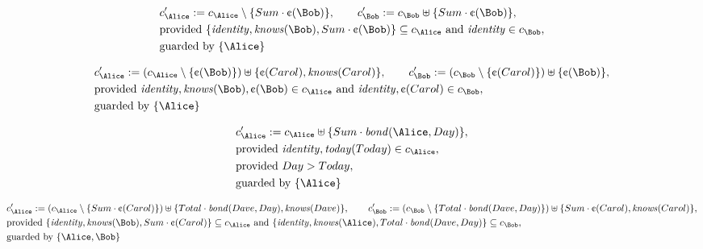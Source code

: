 \begin{align*}
&
c'_
{
\Alice
}
 := 
c_
{
\Alice
}
 \setminus 
\{
Sum
\cdot
\text{\textcent}
(
\Bob
)
\}
, \qquad 
c'_
{
\Bob
}
 := 
c_
{
\Bob
}
 \uplus 
\{
Sum
\cdot
\text{\textcent}
(
\Bob
)
\}
,\\
&
\text{provided } 
\{
\mathit{
identity
}
,
\mathit{
knows
}
(
\Bob
)
,
Sum
\cdot
\text{\textcent}
(
\Bob
)
\}
 \subseteq c_
{
\Alice
}
 \text{ and } 
\mathit{
identity
}
 \in c_
{
\Bob
}
,\\
&
\text{guarded by } \{
\Alice
\}
\end{align*}

\begin{align*}
&
c'_
{
\Alice
}
 := 
(c_
{
\Alice
}
 \setminus 
\{
\text{\textcent}
(
\Bob
)
\}
) \uplus 
\{
\text{\textcent}
(
Carol
)
,
\mathit{
knows
}
(
Carol
)
\}
, \qquad 
c'_
{
\Bob
}
 := 
(c_
{
\Bob
}
 \setminus 
\{
\text{\textcent}
(
Carol
)
\}
) \uplus 
\{
\text{\textcent}
(
\Bob
)
\}
,\\
&
\text{provided } 
\mathit{
identity
}
,
\mathit{
knows
}
(
\Bob
)
,
\text{\textcent}
(
\Bob
)
 \in c_
{
\Alice
}
 \text{ and } 
\mathit{
identity
}
,
\text{\textcent}
(
Carol
)
 \in c_
{
\Bob
}
,\\
&
\text{guarded by } \{
\Alice
\}
\end{align*}

\begin{align*}
&
c'_
{
\Alice
}
 := 
c_
{
\Alice
}
 \uplus 
\{
Sum
\cdot
\mathit{
bond
}
(
\Alice
,
Day
)
\}
,\\
&
\text{provided } 
\mathit{
identity
}
,
\mathit{
today
}
(
Today
)
 \in c_
{
\Alice
}
,\\
&
\text{provided } 
Day
>
Today
,\\
&
\text{guarded by } \{
\Alice
\}
\end{align*}

\begin{align*}
&
c'_
{
\Alice
}
 := 
(c_
{
\Alice
}
 \setminus 
\{
Sum
\cdot
\text{\textcent}
(
Carol
)
\}
) \uplus 
\{
Total
\cdot
\mathit{
bond
}
(
Dave
,
Day
)
,
\mathit{
knows
}
(
Dave
)
\}
, \qquad 
c'_
{
\Bob
}
 := 
(c_
{
\Bob
}
 \setminus 
\{
Total
\cdot
\mathit{
bond
}
(
Dave
,
Day
)
\}
) \uplus 
\{
Sum
\cdot
\text{\textcent}
(
Carol
)
,
\mathit{
knows
}
(
Carol
)
\}
,\\
&
\text{provided } 
\{
\mathit{
identity
}
,
\mathit{
knows
}
(
\Bob
)
,
Sum
\cdot
\text{\textcent}
(
Carol
)
\}
 \subseteq c_
{
\Alice
}
 \text{ and } 
\{
\mathit{
identity
}
,
\mathit{
knows
}
(
\Alice
)
,
Total
\cdot
\mathit{
bond
}
(
Dave
,
Day
)
\}
 \subseteq c_
{
\Bob
}
,\\
&
\text{guarded by } \{
\Alice
,
\Bob
\}
\end{align*}
